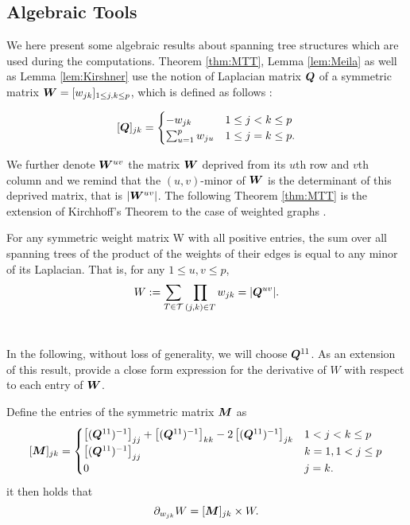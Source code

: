 \tocless \subsection{Algebraic Tools} \label{app:tools}
 We here present some algebraic results about spanning tree structures which are used during the computations. Theorem \ref{thm:MTT}, Lemma \ref{lem:Meila} as well as Lemma \ref{lem:Kirshner} use the notion of Laplacian matrix  ${\boldsymbol{Q}}$ of a symmetric matrix ${\boldsymbol{W}}=[w_{jk} ]_{1\leq j,k\leq p}$, which is defined as follows :
 
\[
 [{\boldsymbol{Q}}]_{jk}  =\begin{cases}
    -w_{jk}  & 1\leq j<k \leq p\\
    \sum_{u=1}^p w_{ju} & 1\leq j=k \leq p.
    \end{cases}
\]
 
We further denote ${\boldsymbol{W}}^{uv}$ the matrix ${\boldsymbol{W}}$ deprived from its $u$th row and $v$th column and we remind that the $(u, v)$-minor of ${\boldsymbol{W}}$ is the determinant of this deprived matrix, that is $|{\boldsymbol{W}}^{uv}|$.
The following Theorem \ref{thm:MTT} is the extension of Kirchhoff's Theorem to the case of weighted graphs \citep{matrixtree,MeilaJaak}.\\
\begin{theorem} \label{thm:MTT}
    For any symmetric weight matrix W with all positive entries, the sum over all spanning trees of the product of the weights of their edges is equal to any minor of its Laplacian. That is, for any $1 \leq u, v \leq p$,
   \[
    W := \sum_{T\in\mathcal{T}} \prod_{(j, k)\in T} w_{jk} = |{\boldsymbol{Q}}^{uv}|.
    \]\\
\end{theorem}    

In the following, without loss of generality, we will choose ${\boldsymbol{Q}}^{11}$. As an extension of this result, \cite{MeilaJaak} provide a close form expression for the derivative of $W$ with respect to each entry of ${\boldsymbol{W}}$. 

\begin{lemma}  \label{lem:Meila}
    Define the entries of the symmetric matrix ${\boldsymbol{M}}$ as
 \[    
 [{\boldsymbol{M}}]_{jk} =\begin{cases}
    \left[({\boldsymbol{Q}}^{11})^{-1}\right]_{jj} + \left[({\boldsymbol{Q}}^{11})^{-1}\right]_{kk} -2\left[({\boldsymbol{Q}}^{11})^{-1}\right]_{jk} & 1< j<k \leq p\\
    \left[({\boldsymbol{Q}}^{11})^{-1}\right]_{jj} & k=1, 1< j \leq p  \\
    0 &  j=k .
    \end{cases}
\]
it then holds that $$\partial_{w_{jk}} W = [{\boldsymbol{M}}]_{jk}  \times W.$$\\
\end{lemma}

